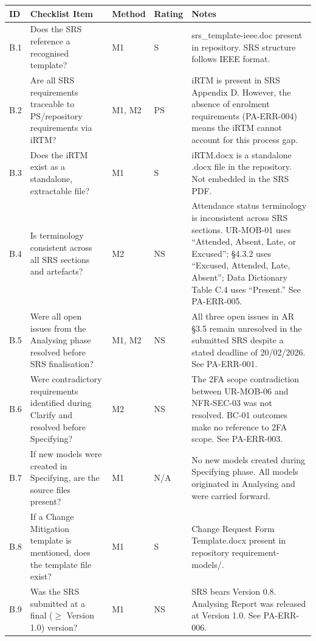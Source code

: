\documentclass[11pt,a4paper]{article}
\begin{document}
\begin{longtable}{|L{0.8cm}|L{4cm}|L{1.3cm}|L{1.3cm}|L{5.5cm}|}
\hline
{}
\textbf{ID} & \textbf{Checklist Item} & \textbf{Method} & \textbf{Rating} & \textbf{Notes} \\
\hline
\endhead
B.1 & Does the SRS reference a recognised template? & M1 & S & srs\_template-ieee.doc present in repository. SRS structure follows IEEE format. \\\hline
B.2 & Are all SRS requirements traceable to PS/repository requirements via iRTM? & M1, M2 & PS & iRTM is present in SRS Appendix D. However, the absence of enrolment requirements (PA-ERR-004) means the iRTM cannot account for this process gap. \\\hline
B.3 & Does the iRTM exist as a standalone, extractable file? & M1 & S & iRTM.docx is a standalone .docx file in the repository. Not embedded in the SRS PDF. \\\hline
B.4 & Is terminology consistent across all SRS sections and artefacts? & M2 & NS & Attendance status terminology is inconsistent across SRS sections. UR-MOB-01 uses ``Attended, Absent, Late, or Excused''; \S4.3.2 uses ``Excused, Attended, Late, Absent''; Data Dictionary Table C.4 uses ``Present.'' See PA-ERR-005. \\\hline
B.5 & Were all open issues from the Analysing phase resolved before SRS finalisation? & M1, M2 & NS & All three open issues in AR \S3.5 remain unresolved in the submitted SRS despite a stated deadline of 20/02/2026. See PA-ERR-001. \\\hline
B.6 & Were contradictory requirements identified during Clarify and resolved before Specifying? & M2 & NS & The 2FA scope contradiction between UR-MOB-06 and NFR-SEC-03 was not resolved. BC-01 outcomes make no reference to 2FA scope. See PA-ERR-003. \\\hline
B.7 & If new models were created in Specifying, are the source files present? & M1 & N/A & No new models created during Specifying phase. All models originated in Analysing and were carried forward. \\\hline
B.8 & If a Change Mitigation template is mentioned, does the template file exist? & M1 & S & Change Request Form Template.docx present in repository requirement-models/. \\\hline
B.9 & Was the SRS submitted at a final ($\geq$ Version 1.0) version? & M1 & NS & SRS bears Version 0.8. Analysing Report was released at Version 1.0. See PA-ERR-006. \\\hline
\end{longtable}
\end{document}
